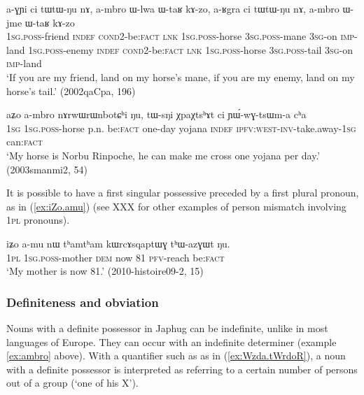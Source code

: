  \begin{exe}
\ex \label{ex:ambro} 
\gll a-ɣɲi ci tɯ\redp{}tɯ-ŋu nɤ, a-mbro ɯ-lwa ɯ-taʁ kɤ-zo, a-ʁgra ci tɯ\redp{}tɯ-ŋu nɤ, a-mbro ɯ-jme ɯ-taʁ kɤ-zo \\
\textsc{1sg.poss}-friend \textsc{indef} \textsc{cond}\redp{}2-be:\textsc{fact} \textsc{lnk} \textsc{1sg.poss}-horse \textsc{3sg.poss}-mane \textsc{3sg}-on \textsc{imp}-land \textsc{1sg.poss}-enemy \textsc{indef} \textsc{cond}\redp{}2-be:\textsc{fact} \textsc{lnk} \textsc{1sg.poss}-horse \textsc{3sg.poss}-tail  \textsc{3sg}-on \textsc{imp}-land  \\
\glt `If you are my friend, land on my horse's mane, if you are my enemy, land on my horse's tail.' (2002qaCpa, 196)
\end{exe}

\begin{exe}
\ex \label{ex:aZo.ambro}
\gll aʑo a-mbro nɤrwɯrɯnbotɕʰi ŋu, tɯ-sŋi χpaχtsʰɤt ci ɲɯ́-wɣ-tsɯm-a cʰa \\
\textsc{1sg} \textsc{1sg.poss}-horse p.n. be:\textsc{fact} one-day yojana \textsc{indef} \textsc{ipfv:west}-\textsc{inv}-take.away-\textsc{1sg} can:\textsc{fact} \\
\glt `My horse is Norbu Rinpoche, he can make me cross one yojana per day.' (2003smanmi2, 54)
\end{exe}

It is possible to have a first singular possessive preceded by a first plural pronoun, as in (\ref{ex:iZo.amu}) (see XXX for other examples of person mismatch involving \textsc{1pl} pronouns).

\begin{exe}
\ex \label{ex:iZo.amu}
\gll iʑo a-mu nɯ tʰamtʰam kɯrcɤsqaptɯɣ tʰɯ-azɣɯt ŋu. \\
\textsc{1pl} \textsc{1sg.poss}-mother \textsc{dem} now 81 \textsc{pfv}-reach  be:\textsc{fact} \\
\glt `My mother is now 81.' (2010-histoire09-2, 15)
\end{exe}

\subsubsection{Definiteness and obviation}
Nouns with a definite possessor in Japhug can be indefinite, unlike in most languages of Europe. They can occur with an indefinite determiner (example \ref{ex:ambro}  above). With a quantifier such as  as in (\ref{ex:Wzda.tWrdoR}), a noun with a definite possessor is interpreted as referring to a certain number of persons out of a group (`one of his X').

